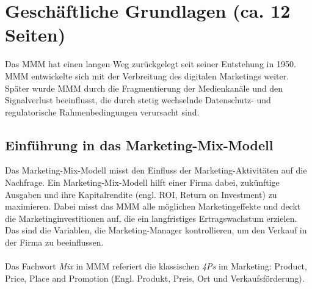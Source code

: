 \newpage
\section{Geschäftliche Grundlagen (ca. 12 Seiten)}
Das \ac{MMM} hat einen langen Weg zurückgelegt seit seiner Entstehung in 1950. \ac{MMM} entwickelte sich mit der Verbreitung des digitalen Marketings weiter. Später wurde \ac{MMM} durch die Fragmentierung der Medienkanäle und den Signalverlust beeinflusst, die durch stetig wechselnde Datenschutz- und regulatorische Rahmenbedingungen verursacht sind\cite{MMMdef}.
\subsection{Einführung in das Marketing-Mix-Modell}
Das Marketing-Mix-Modell misst den Einfluss der Marketing-Aktivitäten auf die Nachfrage. Ein Marketing-Mix-Modell hilft einer Firma dabei, zukünftige Ausgaben und ihre Kapitalrendite (engl. \ac{ROI}, Return on Investment) zu maximieren. Dabei misst das \ac{MMM} alle möglichen Marketingeffekte und deckt die Marketinginvestitionen auf, die ein langfristiges Ertragswachstum erzielen. Das sind die Variablen, die Marketing-Manager kontrollieren, um den Verkauf in der Firma zu beeinflussen. \\\\Das Fachwort \textit{Mix} in \ac{MMM} referiert die klassischen \textit{4Ps} im Marketing: Product, Price, Place and Promotion (Engl. Produkt, Preis, Ort und Verkaufsförderung)\cite[S. 109 ff]{akinkunmi2018data}. \\\\
